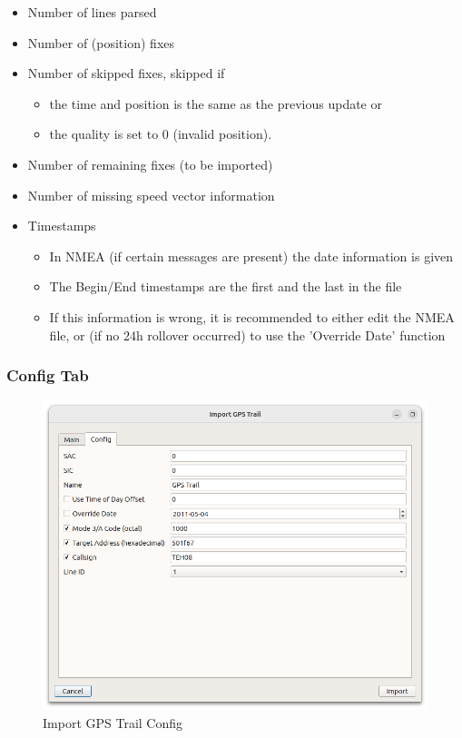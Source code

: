 \begin{itemize}
\item Number of lines parsed
\item Number of (position) fixes
\item Number of skipped fixes, skipped if
\begin{itemize}
\item the time  and position is the same as the previous update or
\item the quality is set to 0 (invalid position).
\end{itemize}
\item Number of remaining fixes (to be imported)
\item Number of missing speed vector information
\item Timestamps
\begin{itemize}
\item In NMEA (if certain messages are present) the date information is given
\item The Begin/End timestamps are the first and the last in the file
\item If this information is wrong, it is recommended to either edit the NMEA file, or (if no 24h rollover occurred) to use the 'Override Date' function
\end{itemize}
\end{itemize}

\subsubsection{Config Tab}

\begin{figure}[H]
    \includegraphics[width=16cm]{figures/gps_import_config.png}
  \caption{Import GPS Trail Config}
\end{figure}

